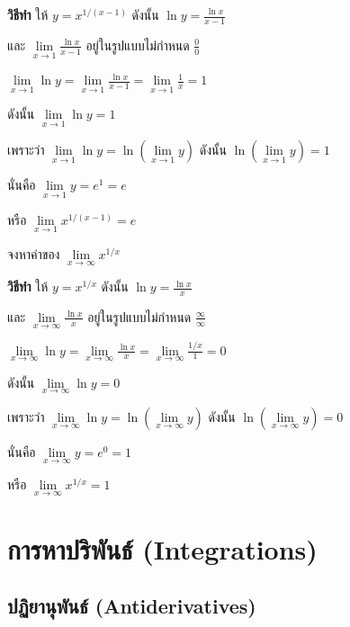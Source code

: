 \documentclass[
]{book}
\begin{document}
\textbf{วิธีทำ} ให้ \(y=x^{1/(x-1)}\) ดังนั้น
\(\displaystyle \ln y=\frac{\ln x}{x-1}\)

และ \(\displaystyle \mathop {\lim }\limits_{x\to 1} \frac{\ln x}{x-1}\)
อยู่ในรูปแบบไม่กำหนด \(\displaystyle \frac{0}{0}\)

\(\displaystyle \mathop {\lim }\limits_{x\to 1} \ln y=\mathop {\lim
}\limits_{x\to 1}
\frac{\ln x}{x-1}=\mathop {\lim }\limits_{x\to 1} \frac{1}{x}=1\)

ดังนั้น \(\mathop {\lim }\limits_{x\to 1} \ln y=1\)

เพราะว่า \(\mathop {\lim }\limits_{x\to 1} \ln y=\ln (\mathop {\lim
}\limits_{x\to 1} y)\) ดังนั้น
\(\ln (\mathop {\lim }\limits_{x\to 1} y)=1\)

นั่นคือ \(\mathop {\lim }\limits_{x\to 1} y=e^1=e\)

หรือ \(\mathop {\lim }\limits_{x\to 1} x^{1/(x-1)}=e\)

จงหาค่าของ \(\mathop {\lim }\limits_{x\to \infty } x^{1/x}\)

\textbf{วิธีทำ} ให้ \(y=x^{1/x}\) ดังนั้น
\(\displaystyle \ln y=\frac{\ln x}{x}\)

และ
\(\displaystyle \mathop {\lim }\limits_{x\to \infty } \frac{\ln x}{x}\)
อยู่ในรูปแบบไม่กำหนด \(\displaystyle \frac{\infty }{\infty }\)

\(\displaystyle \mathop {\lim }\limits_{x\to \infty } \ln y=\mathop {\lim
}\limits_{x\to
\infty } \frac{\ln x}{x}=\mathop {\lim }\limits_{x\to \infty }
\frac{1/x}{1}=0\)

ดังนั้น \(\mathop {\lim }\limits_{x\to \infty } \ln y=0\)

เพราะว่า \(\mathop {\lim }\limits_{x\to \infty } \ln y=\ln (\mathop {\lim
}\limits_{x\to \infty } y)\) ดังนั้น \(\ln (\mathop {\lim }\limits_{x\to
\infty } y)=0\)

นั่นคือ \(\mathop {\lim }\limits_{x\to \infty } y=e^0=1\)

หรือ \(\mathop {\lim }\limits_{x\to \infty } x^{1/x}=1\)

\chapter{การหาปริพันธ์
(Integrations)}\label{uxe01uxe32uxe23uxe2buxe32uxe1buxe23uxe1euxe19uxe18-integrations}

\section{ปฏิยานุพันธ์
(Antiderivatives)}\label{uxe1buxe0fuxe22uxe32uxe19uxe1euxe19uxe18-antiderivatives}
\end{document}
